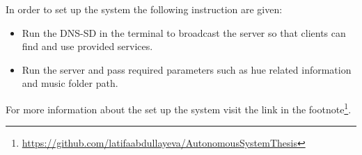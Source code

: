 In order to set up the system the following instruction are given:
\begin{itemize}
    \item Run the DNS-SD in the terminal to broadcast the server so that clients can find and use provided services.
    \item Run the server and pass required parameters such as hue related information and music folder path.
\end{itemize}
For more information about the set up the system visit the link in the
footnote\footnote{\url{https://github.com/latifaabdullayeva/AutonomousSystemThesis}}.


